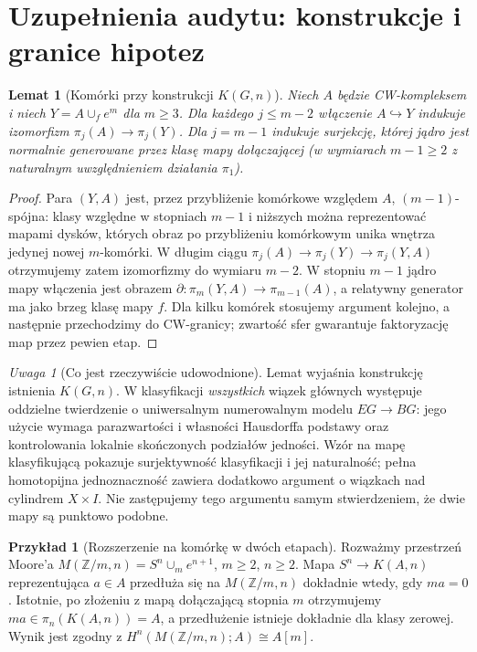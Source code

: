 \documentclass[11pt,a4paper,oneside]{report}
\newcommand{\Z}{\mathbb{Z}}
\theoremstyle{plain}
\newtheorem{lemat}[twierdzenie]{Lemat}
\theoremstyle{definition}
\newtheorem{przyklad}[twierdzenie]{Przykład}
\theoremstyle{remark}
\newtheorem{uwaga}[twierdzenie]{Uwaga}
\begin{document}
\section{Uzupełnienia audytu: konstrukcje i granice hipotez}
\label{sec:audyt-VI-VII}
\begin{lemat}[Komórki przy konstrukcji $K(G,n)$]
Niech $A$ będzie CW-kompleksem i niech $Y=A\cup_f e^{m}$
dla $m\ge3$. Dla każdego $j\le m-2$ włączenie
$A\hookrightarrow Y$ indukuje izomorfizm
$\pi_j(A)\to\pi_j(Y)$. Dla $j=m-1$ indukuje
surjekcję, której jądro jest normalnie generowane
przez klasę mapy dołączającej (w wymiarach $m-1\ge2$
z naturalnym uwzględnieniem działania $\pi_1$).
\end{lemat}
\begin{proof}
Para $(Y,A)$ jest, przez przybliżenie komórkowe
względem $A$, $(m-1)$-spójna: klasy względne w stopniach
$m-1$ i niższych można reprezentować mapami dysków,
których obraz po przybliżeniu komórkowym unika wnętrza
jedynej nowej $m$-komórki. W długim ciągu
$\pi_j(A)\to\pi_j(Y)\to\pi_j(Y,A)$
otrzymujemy zatem izomorfizmy do wymiaru $m-2$.
W stopniu $m-1$ jądro mapy włączenia jest obrazem
$\partial:\pi_m(Y,A)\to\pi_{m-1}(A)$,
a relatywny generator ma jako brzeg klasę mapy $f$.
Dla kilku komórek stosujemy argument kolejno,
a następnie przechodzimy do CW-granicy; zwartość
sfer gwarantuje faktoryzację map przez pewien etap.
\end{proof}

\begin{uwaga}[Co jest rzeczywiście udowodnione]
Lemat wyjaśnia konstrukcję istnienia $K(G,n)$.
W klasyfikacji \emph{wszystkich} wiązek głównych
występuje oddzielne twierdzenie o uniwersalnym
numerowalnym modelu $EG\to BG$: jego użycie wymaga
parazwartości i własności Hausdorffa podstawy
oraz kontrolowania lokalnie skończonych podziałów
jedności. Wzór na mapę klasyfikującą pokazuje
surjektywność klasyfikacji i jej naturalność;
pełna homotopijna jednoznaczność zawiera dodatkowo
argument o wiązkach nad cylindrem $X\times I$.
Nie zastępujemy tego argumentu samym stwierdzeniem,
że dwie mapy są punktowo podobne.
\end{uwaga}

\begin{przyklad}[Rozszerzenie na komórkę w dwóch etapach]
Rozważmy przestrzeń Moore'a
$M(\Z/m,n)=S^n\cup_{m}e^{n+1}$,
$m\ge2$, $n\ge2$. Mapa $S^n\to K(A,n)$
reprezentująca $a\in A$ przedłuża się na
$M(\Z/m,n)$ dokładnie wtedy, gdy $ma=0$.
Istotnie, po złożeniu z mapą dołączającą stopnia $m$
otrzymujemy $ma\in\pi_n(K(A,n))=A$, a przedłużenie
istnieje dokładnie dla klasy zerowej. Wynik jest zgodny
z $H^n(M(\Z/m,n);A)\cong A[m]$.
\end{przyklad}
\end{document}
